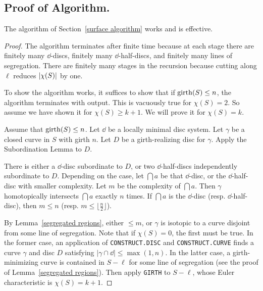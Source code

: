 \subsection{Proof of Algorithm.}

\begin{claim}
The algorithm of Section~\ref{surface algorithm} works and is effective.
\end{claim}

\begin{proof}
The algorithm terminates after finite time because at each stage there 
are finitely many $\dd$-discs, finitely many $\dd$-half-discs, and 
finitely many lines of segregation.  There are finitely many stages in the
recursion because cutting along $\ell$ reduces $| \chi (S) |$ by one.

To show the algorithm works, it suffices to show that if $\operatorname{girth}(S)\leq n$,
the algorithm terminates with output.  This is vacuously true for $\chi(S)=2$.
So assume we have shown it for $\chi(S)\geq k+1$.  We will prove
it for $\chi(S)=k$.

Assume that $\operatorname{girth}(S)\leq n$.  
Let $\dd$ be a locally minimal disc system.
Let $\gamma$ be a closed curve in $S$ with girth $n$.  Let $D$ be a 
girth-realizing disc for $\gamma$.  Apply the Subordination Lemma to $D$.

There is either a $\dd$-disc subordinate to $D$, or two $\dd$-half-discs 
independently subordinate to $D$.  Depending on the case, let $\dint{a}$ 
be that $\dd$-disc, or the $\dd$-half-disc with smaller complexity.
Let $m$ be the complexity of $\dint{a}$.  Then $\gamma$ homotopically
intersects $\dint{a}$ exactly $n$ times.  If $\dint{a}$ is the $\dd$-disc
(resp. $\dd$-half-disc), then $m\leq n$ (resp. 
$m\leq\lfloor\frac{n}{2}\rfloor$).

By Lemma~\ref{segregated regions}, either $\leq m$, 
or $\gamma$ is isotopic to a curve disjoint from some line of segregation.  
Note that if $\chi (S)=0$, the first must be true.  In the former case, 
an application of \texttt{CONSTRUCT.DISC} and \texttt{CONSTRUCT.CURVE} 
finds a curve $\gamma$ and disc $D$ satisfying $|\gamma\cap\dd|\leq\max(1,n)$.
In the latter case, a girth-minimizing curve is contained 
in $S-\ell$ for some line of segregation 
(see the proof of Lemma~\ref{segregated regions}).
Then apply \texttt{GIRTH} to $S-\ell$, whose Euler characteristic 
is $\chi(S)=k+1$.
\end{proof}













